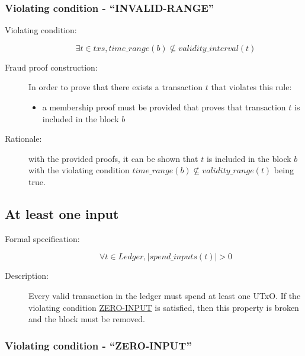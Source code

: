 \documentclass[../midgard.tex]{subfiles}
\begin{document}
\subsubsection{Violating condition - ``INVALID-RANGE''}
\label{sec:INVALID-RANGE}

\begin{description}

\item[Violating condition:]
\begin{equation*}
    \exists t \in txs, time\_range(b) \nsubseteq validity\_interval(t)
\end{equation*}

\item[Fraud proof construction:] In order to prove that there exists a transaction $t$ that violates this rule:
\begin{itemize}
    \item a membership proof must be provided that proves that transaction $t$ is included in the block $b$
\end{itemize}

\item[Rationale:] with the provided proofs, it can be shown that $t$ is included in the block $b$ with the violating condition $time\_range(b) \nsubseteq validity\_range(t)$ being true.

\end{description}

\subsection{At least one input}

\begin{description}

\item[Formal specification:]
\begin{equation*}
    \forall t \in Ledger, |spend\_inputs(t)| > 0
\end{equation*}

\item[Description:] Every valid transaction in the ledger must spend at least one UTxO.
  If the violating condition \hyperref[sec:ZERO-INPUT]{ZERO-INPUT} is satisfied, then this property is broken and the block must be removed.

\end{description}

\subsubsection{Violating condition - ``ZERO-INPUT''}
\label{sec:ZERO-INPUT}
\end{document}
